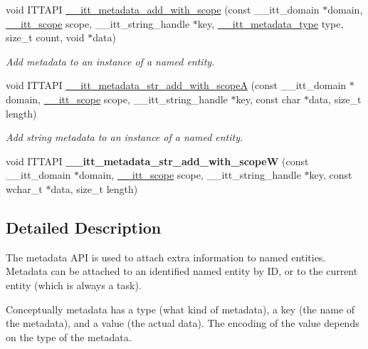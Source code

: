 \begin{DoxyCompactItemize}
\item 
void I\+T\+T\+A\+P\+I \hyperlink{group__metadata_ga281377e05c2aaa34124be44d4f32d6aa}{\+\_\+\+\_\+itt\+\_\+metadata\+\_\+add\+\_\+with\+\_\+scope} (const \+\_\+\+\_\+itt\+\_\+domain $\ast$domain, \hyperlink{group__markers_ga9712c6a992a435d4d134e7164f609f04}{\+\_\+\+\_\+itt\+\_\+scope} scope, \+\_\+\+\_\+itt\+\_\+string\+\_\+handle $\ast$key, \hyperlink{group__metadata_ga906320efadd24c37fc2ee021e880a673}{\+\_\+\+\_\+itt\+\_\+metadata\+\_\+type} type, size\+\_\+t count, void $\ast$data)
\begin{DoxyCompactList}\small\item\em Add metadata to an instance of a named entity. \end{DoxyCompactList}\item 
void I\+T\+T\+A\+P\+I \hyperlink{group__metadata_ga4c53d5ec2eebfd017f3867239750a0ec}{\+\_\+\+\_\+itt\+\_\+metadata\+\_\+str\+\_\+add\+\_\+with\+\_\+scope\+A} (const \+\_\+\+\_\+itt\+\_\+domain $\ast$domain, \hyperlink{group__markers_ga9712c6a992a435d4d134e7164f609f04}{\+\_\+\+\_\+itt\+\_\+scope} scope, \+\_\+\+\_\+itt\+\_\+string\+\_\+handle $\ast$key, const char $\ast$data, size\+\_\+t length)
\begin{DoxyCompactList}\small\item\em Add string metadata to an instance of a named entity. \end{DoxyCompactList}\item 
\hypertarget{group__metadata_ga2bd3d1d2de57df7483d7d5b8324e23e0}{}void I\+T\+T\+A\+P\+I {\bfseries \+\_\+\+\_\+itt\+\_\+metadata\+\_\+str\+\_\+add\+\_\+with\+\_\+scope\+W} (const \+\_\+\+\_\+itt\+\_\+domain $\ast$domain, \hyperlink{group__markers_ga9712c6a992a435d4d134e7164f609f04}{\+\_\+\+\_\+itt\+\_\+scope} scope, \+\_\+\+\_\+itt\+\_\+string\+\_\+handle $\ast$key, const wchar\+\_\+t $\ast$data, size\+\_\+t length)\label{group__metadata_ga2bd3d1d2de57df7483d7d5b8324e23e0}

\end{DoxyCompactItemize}


\subsection{Detailed Description}
The metadata A\+P\+I is used to attach extra information to named entities. Metadata can be attached to an identified named entity by I\+D, or to the current entity (which is always a task).

Conceptually metadata has a type (what kind of metadata), a key (the name of the metadata), and a value (the actual data). The encoding of the value depends on the type of the metadata.


